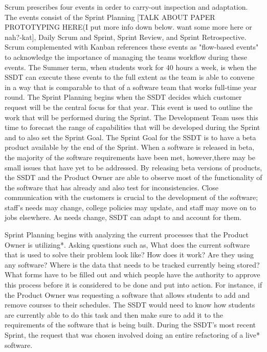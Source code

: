 Scrum prescribes four events in order to carry-out inspection and adaptation. The events consist of the Sprint Planning [TALK ABOUT PAPER PROTOTYPING HERE(I put more info down below. want some more here or nah?-kat], Daily Scrum and Sprint, Sprint Review, and Sprint Retrospective. Scrum complemented with Kanban references these events as "flow-based events" to acknowledge the importance of managing the teams workflow during these events. The Summer term, when students work for 40 hours a week, is when the SSDT can execute these events to the full extent as the team is able to convene in a way that is comparable to that of a software team that works full-time year round. The Sprint Planning begins when the SSDT decides which customer request will be the central focus for that year. This event is used to outline the work that will be performed during the Sprint. The Development Team uses this time to forecast the range of capabilities that will be developed during the Sprint and to also set the Sprint Goal. The Sprint Goal for the SSDT is to have a beta product available by the end of the Sprint.  When a software is released in beta, the majority of the software requirements have been met, however,there may be small issues that have yet to be addressed.  By releasing beta versions of products, the SSDT and the Product Owner are able to observe most of the functionality of the software that has already and also test for inconsistencies. Close communication with the customers is crucial to the development of the software; staff's needs may change, college policies may update, and staff may move on to jobs elsewhere. As needs change, SSDT can adapt to and account for them.

Sprint Planning begins with analyzing the current processes that the Product Owner is utilizing*. Asking questions such as, What does the current software that is used to solve their problem look like? How does it work? Are they using any software? Where is the data that needs to be tracked currently being stored? What forms have to be filled out and which people have the authority to approve this process before it is considered to be done and put into action. For instance, if the Product Owner was requesting a software that allows students to add and remove courses to their schedules. The SSDT would need to know how students are currently able to do this task and then make sure to add it to the requirements of the software that is being built. During the SSDT's most recent Sprint, the request that was chosen involved doing an entire refactoring of a live* software. 

